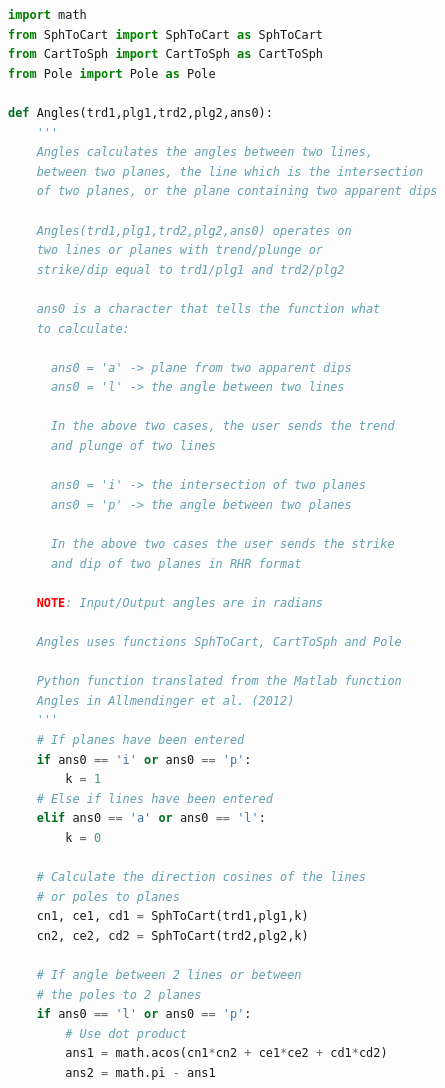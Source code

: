 \documentclass[a4paper , 12pt]{book}
\begin{document}
\begin{center}
\begin{lstlisting}[language=Python, frame=single]
import math
from SphToCart import SphToCart as SphToCart
from CartToSph import CartToSph as CartToSph
from Pole import Pole as Pole

def Angles(trd1,plg1,trd2,plg2,ans0):
    '''
    Angles calculates the angles between two lines, 
    between two planes, the line which is the intersection 
    of two planes, or the plane containing two apparent dips

    Angles(trd1,plg1,trd2,plg2,ans0) operates on
    two lines or planes with trend/plunge or 
    strike/dip equal to trd1/plg1 and trd2/plg2

    ans0 is a character that tells the function what 
    to calculate:

      ans0 = 'a' -> plane from two apparent dips
      ans0 = 'l' -> the angle between two lines

      In the above two cases, the user sends the trend 
      and plunge of two lines

      ans0 = 'i' -> the intersection of two planes
      ans0 = 'p' -> the angle between two planes
 
      In the above two cases the user sends the strike 
      and dip of two planes in RHR format

    NOTE: Input/Output angles are in radians

    Angles uses functions SphToCart, CartToSph and Pole

    Python function translated from the Matlab function 
    Angles in Allmendinger et al. (2012)
    '''
    # If planes have been entered
    if ans0 == 'i' or ans0 == 'p':
        k = 1
    # Else if lines have been entered
    elif ans0 == 'a' or ans0 == 'l':
        k = 0
    
    # Calculate the direction cosines of the lines 
    # or poles to planes
    cn1, ce1, cd1 = SphToCart(trd1,plg1,k)
    cn2, ce2, cd2 = SphToCart(trd2,plg2,k)
    
    # If angle between 2 lines or between 
    # the poles to 2 planes
    if ans0 == 'l' or ans0 == 'p':
        # Use dot product 
        ans1 = math.acos(cn1*cn2 + ce1*ce2 + cd1*cd2)
        ans2 = math.pi - ans1
    

\end{lstlisting}
\end{center}
\end{document}
